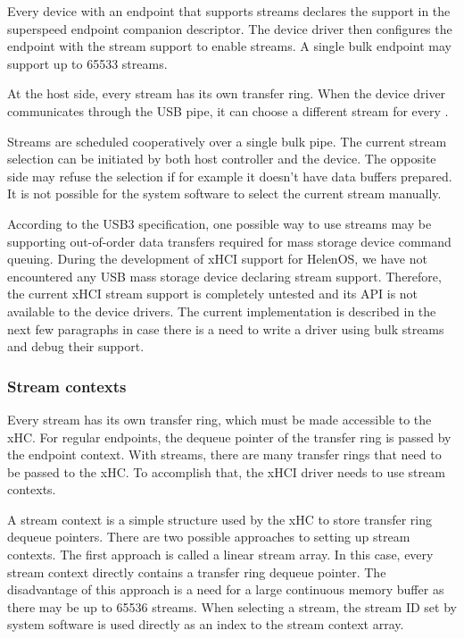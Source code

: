 Every device with an endpoint that supports streams declares the support in the
superspeed endpoint companion descriptor. The device driver then
configures the endpoint with the stream support to enable streams. A single
bulk endpoint may support up to 65533 streams.

At the host side, every stream has its own transfer ring. When the device
driver communicates through the USB pipe, it can choose a different stream for
every .

Streams are scheduled cooperatively over a single bulk pipe. The current stream
selection can be initiated by both host controller and the device. The opposite
side may refuse the selection if for example it doesn't have data buffers
prepared. It is not possible for the system software to select the current
stream manually.

According to the USB3 specification, one possible way to use streams may be
supporting out-of-order data transfers required for mass storage device command
queuing. During the development of xHCI support for HelenOS, we have not
encountered any USB mass storage device declaring stream support. Therefore,
the current xHCI stream support is completely untested and its API is not
available to the device drivers. The current implementation is described in the
next few paragraphs in case there is a need to write a driver using bulk
streams and debug their support.

\subsubsection{Stream contexts}

Every stream has its own transfer ring, which must be made
accessible to the xHC. For regular endpoints, the dequeue pointer of the
transfer ring is passed by the endpoint context. With streams, there are many
transfer rings that need to be passed to the xHC. To accomplish that, the
xHCI driver needs to use stream contexts.

A stream context is a simple structure used by the xHC to store transfer ring
dequeue pointers. There are two possible approaches to setting up stream
contexts. The first approach is called a linear stream array. In this case,
every stream context directly contains a transfer ring dequeue pointer. The
disadvantage of this approach is a need for a large continuous memory buffer as
there may be up to 65536 streams. When selecting a stream, the stream ID set by
system software is used directly as an index to the stream context array.

